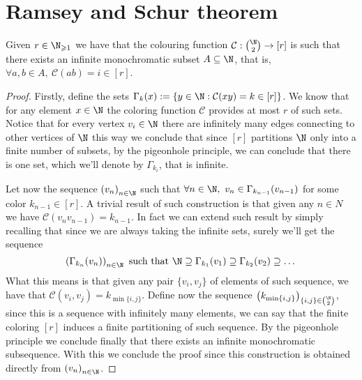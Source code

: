 \section{Ramsey and Schur theorem}

\begin{theorem}\label{ramseyThmGraphs}
   Given \(r \in \N_{\geqslant 1}\) we have that the colouring function
   \(\mathcal{C}: \binom{\N}{2} \to [r]\) is such that there exists an
   infinite monochromatic subset \(A \subseteq \N\), that is, \(\forall a, b
   \in A,\ \mathcal{C}(ab) = i \in [r]\).
\end{theorem}

\begin{proof}
   Firstly, define the sets \(\Gamma_k(x) := \{y \in \N : \mathcal{C}(x
   y) = k \in [r]\}\). We know that for any element \(x \in \N\) the
   coloring function \(\mathcal{C}\) provides at most \(r\) of such sets. Notice
   that for every vertex \(v_i \in \N\) there are infinitely many edges
   connecting to other vertices of \(\N\) this way we conclude that
   since \([r]\) partitions \(\N\) only into a finite number of subsets,
   by the pigeonhole principle, we can conclude that there is one set, which
   we'll denote by \(\Gamma_{k_i}\), that is infinite.

   Let now the sequence \(\left( v_n \right)_{n \in \N}\) such that
   \(\forall n \in \N,\ v_n \in \Gamma_{k_{n-1}}(v_{n-1})\) for some
   color \(k_{n-1} \in [r]\). A trivial result of such construction is that
   given any \(n \in N\) we have \(\mathcal{C}(v_n v_{n-1}) = k_{n-1}\). In fact
   we can extend such result by simply recalling that since we are always taking
   the infinite sets, surely we'll get the sequence
   \[
      \left( \Gamma_{k_{n}}(v_n) \right)_{n \in \N} \text{ such that }
      \N \supseteq \Gamma_{k_{1}}(v_1) \supseteq  \Gamma_{k_{2}}(v_2)
      \supseteq \dots
   \]
   What this means is that given any pair \(\{v_i, v_j\}\) of elements of such
   sequence, we have that \(\mathcal{C}(v_i, v_j) = k_{\min \{i, j\}}\). Define
   now the sequence \(\left( k_{\min \{i, j\}} \right)_{\{i, j\} \in
   \binom{\N}{2}}\), since this is a sequence with infinitely many
   elements, we can say that the finite coloring \([r]\) induces a finite
   partitioning of such sequence. By the pigeonhole principle we conclude
   finally that there exists an infinite monochromatic subsequence. With this we
   conclude the proof since this construction is obtained directly from \(\left(
   v_n \right)_{n \in \N}\).
\end{proof}

